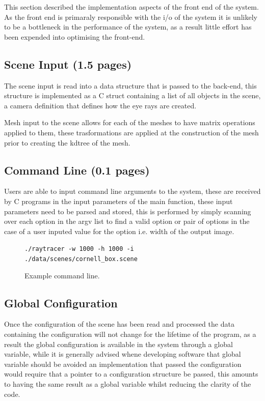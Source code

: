 This section described the implementation aspects of the front end of the system. As the front end is primaraly responsible
with the i/o of the system it is unlikely to be a bottleneck in the performance of the system, as a result little effort
has been expended into optimising the front-end.

\subsection{Scene Input (1.5 pages)}
The scene input is read into a data structure that is passed to the back-end, this structure is implemented as a C struct
containing a list of all objects in the scene, a camera definition that defines how the eye rays are created.

Mesh input to the scene allows for each of the meshes to have matrix operations applied to them, these trasformations
are applied at the construction of the mesh prior to creating the kdtree of the mesh.

\subsection{Command Line (0.1 pages)}
Users are able to input command line arguments to the system, these are received by C programs in the input parameters of
the main function, these input parameters need to be parsed and stored, this is performed by simply scanning over each
option in the argv list to find a valid option or pair of options in the case of a user inputed value for the option
i.e. width of the output image.

\begin{figure}
\texttt{./raytracer -w 1000 -h 1000 -i ./data/scenes/cornell\_box.scene}
\caption{Example command line.}
\end{figure}

\subsection{Global Configuration}
Once the configuration of the scene has been read and processed the data containing the configuration will not change for
the lifetime of the program, as a result the global configuration is available in the system through a global variable, while
it is generally advised whene developing software that global variable should be avoided an implementation that passed the
configuration would require that a pointer to a configuration structure be passed, this amounts to having the same result
as a global variable whilst reducing the clarity of the code.

